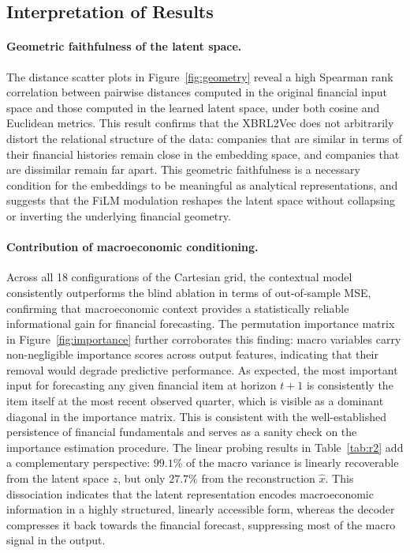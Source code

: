 \documentclass[a4paper,fleqn]{cas-dc}
\begin{document}
\subsection{Interpretation of Results}

\paragraph{Geometric faithfulness of the latent space.}
The distance scatter plots in Figure~\ref{fig:geometry} reveal a high Spearman rank correlation between pairwise distances computed in the original financial input space and those computed in the learned latent space, under both cosine and Euclidean metrics.  This result confirms that the XBRL2Vec does not arbitrarily distort the relational structure of the data: companies that are similar in terms of their financial histories remain close in the embedding space, and companies that are dissimilar remain far apart.  This geometric faithfulness is a necessary condition for the embeddings to be meaningful as analytical representations, and suggests that the FiLM modulation reshapes the latent space without collapsing or inverting the underlying financial geometry.

\paragraph{Contribution of macroeconomic conditioning.}
Across all 18 configurations of the Cartesian grid, the contextual model consistently outperforms the blind ablation in terms of out-of-sample MSE, confirming that macroeconomic context provides a statistically reliable informational gain for financial forecasting.  The permutation importance matrix in Figure~\ref{fig:importance} further corroborates this finding: macro variables carry non-negligible importance scores across output features, indicating that their removal would degrade predictive performance.  As expected, the most important input for forecasting any given financial item at horizon $t{+}1$ is consistently the item itself at the most recent observed quarter, which is visible as a dominant diagonal in the importance matrix.  This is consistent with the well-established persistence of financial fundamentals and serves as a sanity check on the importance estimation procedure.  The linear probing results in Table~\ref{tab:r2} add a complementary perspective: $99.1\%$ of the macro variance is linearly recoverable from the latent space $z$, but only $27.7\%$ from the reconstruction $\hat{x}$.  This dissociation indicates that the latent representation encodes macroeconomic information in a highly structured, linearly accessible form, whereas the decoder compresses it back towards the financial forecast, suppressing most of the macro signal in the output.
\end{document}
